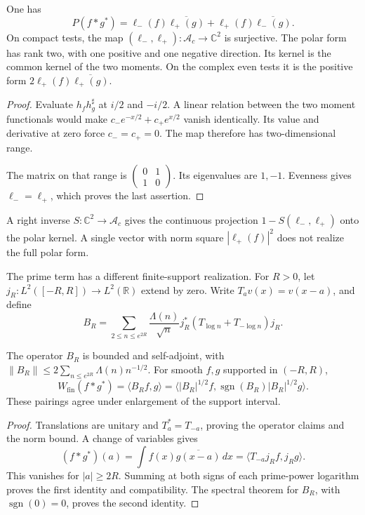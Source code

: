 \begin{proposition}
\label{v4-arith:weil:prop:polar}
One has
\begin{equation}
 P(f*g^*)=
 \ell_-(f)\overline{\ell_+(g)}
       +\ell_+(f)\overline{\ell_-(g)}.
 \label{v4-arith:weil:eq:polar}
\end{equation}
On compact tests, the map
\((\ell_-,\ell_+):\mathscr A_c\to\mathbb C^2\) is surjective.
The polar form has rank two, with one positive and one negative
direction. Its kernel is the common kernel of the two moments.
On the complex even tests it is the positive form
\(2\ell_+(f)\overline{\ell_+(g)}\).
\end{proposition}
\begin{proof}
Evaluate \(h_fh_g^\sharp\) at \(i/2\) and \(-i/2\).
A linear relation between the two moment functionals would make
\(c_-e^{-x/2}+c_+e^{x/2}\) vanish identically.
Its value and derivative at zero force \(c_-=c_+=0\).
The map therefore has two-dimensional range.

The matrix on that range is
\(\left(\begin{smallmatrix}0&1\\1&0\end{smallmatrix}\right)\).
Its eigenvalues are \(1,-1\). Evenness gives \(\ell_-=\ell_+\),
which proves the last assertion.
\end{proof}

A right inverse \(S:\mathbb C^2\to\mathscr A_c\) gives the continuous
projection \(1-S(\ell_-,\ell_+)\) onto the polar kernel.
A single vector with norm square \(|\ell_+(f)|^2\) does not realize
the full polar form.

The prime term has a different finite-support realization.
For \(R>0\), let \(j_R:L^2([-R,R])\to L^2(\mathbb R)\) extend by zero.
Write \(T_a v(x)=v(x-a)\), and define
\begin{equation}
 B_R=\sum_{2\le n\le e^{2R}}\frac{\Lambda(n)}{\sqrt n}
                  j_R^*(T_{\log n}+T_{-\log n})j_R.
 \label{v4-arith:weil:eq:prime-operator}
\end{equation}

\begin{proposition}
\label{v4-arith:weil:prop:prime-operator}
The operator \(B_R\) is bounded and self-adjoint, with
\(\|B_R\|\le2\sum_{n\le e^{2R}}\Lambda(n)n^{-1/2}\).
For smooth \(f,g\) supported in \((-R,R)\),
\[
 W_{\mathrm{fin}}(f*g^*)=\langle B_Rf,g\rangle
 =\langle |B_R|^{1/2}f,
                  \operatorname{sgn}(B_R)|B_R|^{1/2}g\rangle.
\]
These pairings agree under enlargement of the support interval.
\end{proposition}
\begin{proof}
Translations are unitary and \(T_a^*=T_{-a}\), proving the operator
claims and the norm bound. A change of variables gives
\[
 (f*g^*)(a)=\int f(x)\overline{g(x-a)}\,dx
                     =\langle T_{-a}j_Rf,j_Rg\rangle.
\]
This vanishes for \(|a|\ge2R\). Summing at both signs of each
prime-power logarithm proves the first identity and compatibility.
The spectral theorem for \(B_R\), with \(\operatorname{sgn}(0)=0\),
proves the second identity.
\end{proof}

